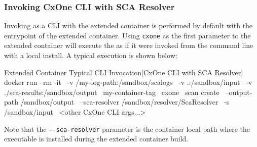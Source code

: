 \subsubsection{Invoking CxOne CLI with SCA Resolver}

Invoking \scaresolver as a CLI with the extended container is performed by default with the entrypoint
of the extended container.  Using \texttt{cxone} as the first parameter to the extended container will
execute the \cxonecli as if it were invoked from the command line with a local install. A typical
execution is shown below:\\


\begin{code}{Extended Container Typical CLI Invocation}{[CxOne CLI with SCA Resolver]}{}
    docker run --rm -it \
        -v /my-log-path:/sandbox/scalogs \
        -v .:/sandbox/input \
        -v ./sca-results:/sandbox/output \
        my-container-tag \
        cxone \
        scan create \
        --output-path /sandbox/output \
        --sca-resolver /sandbox/resolver/ScaResolver \
        -s /sandbox/input \
        <other CxOne CLI args...>
\end{code}

Note that the \texttt{----sca-resolver} parameter is the container local path where the \scaresolver
executable is installed during the extended container build.
